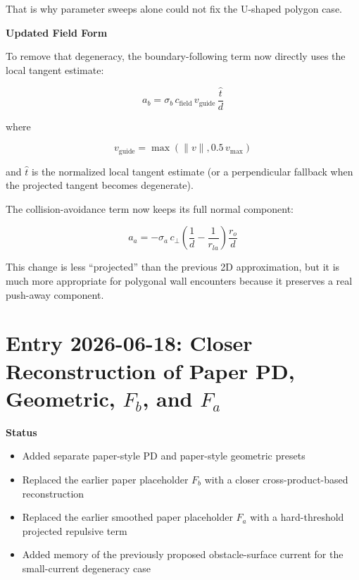 \documentclass[11pt]{article}
\begin{document}
That is why parameter sweeps alone could not fix the U-shaped polygon case.

\textbf{Updated Field Form}

To remove that degeneracy, the boundary-following term now directly uses the
local tangent estimate:

\begin{equation}
a_b = \sigma_b \, c_{\text{field}} \, v_{\text{guide}} \, \frac{\hat{t}}{d}
\end{equation}

where

\begin{equation}
v_{\text{guide}} = \max(\lVert v \rVert, 0.5\,v_{\max})
\end{equation}

and $\hat{t}$ is the normalized local tangent estimate (or a perpendicular
fallback when the projected tangent becomes degenerate).

The collision-avoidance term now keeps its full normal component:

\begin{equation}
a_a =
- \sigma_a \, c_{\perp}
\left(
\frac{1}{d} - \frac{1}{r_{la}}
\right)
\frac{r_o}{d}
\end{equation}

This change is less ``projected'' than the previous 2D approximation, but it is
much more appropriate for polygonal wall encounters because it preserves a real
push-away component.

\section*{Entry 2026-06-18: Closer Reconstruction of Paper PD, Geometric, \(F_b\), and \(F_a\)}

\textbf{Status}

\begin{itemize}[leftmargin=*]
  \item Added separate paper-style PD and paper-style geometric presets
  \item Replaced the earlier paper placeholder \(F_b\) with a closer cross-product-based reconstruction
  \item Replaced the earlier smoothed paper placeholder \(F_a\) with a hard-threshold projected repulsive term
  \item Added memory of the previously proposed obstacle-surface current for the small-current degeneracy case
\end{itemize}
\end{document}
